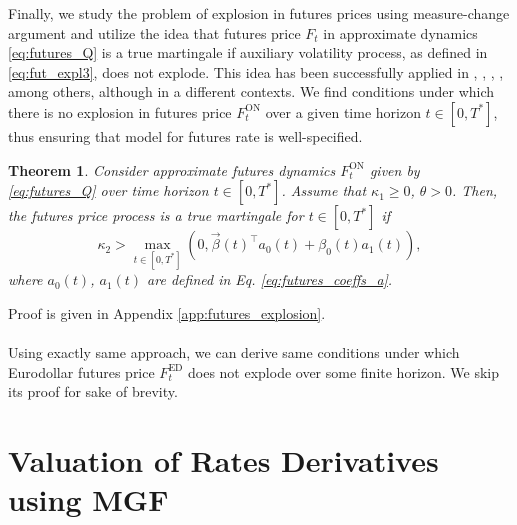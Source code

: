 \documentclass[pdftex,11pt,a4paper] {article}
\newtheorem{theorem}{Theorem}[section]
\begin{document}

 
Finally, we study the problem of explosion in futures prices using measure-change argument and utilize the idea that futures price $ F_t$ in approximate dynamics \eqref{eq:futures_Q} is a true martingale if auxiliary volatility process, as defined in \eqref{eq:fut_expl3}, does not explode. This idea has been successfully applied in \cite{Sin1998}, \cite{Lewis2000}, \cite{Lucic2004}, \cite{Lions2007}, among others, although in a different contexts. We find conditions under which there is no explosion in futures price $F^{\mathrm{ON}}_t$ over a given time horizon $t\in [0,T^*]$, thus ensuring that model for futures rate is well-specified. 

\begin{theorem}\label{thm:futures_explosion}
Consider approximate futures dynamics $ F^{\mathrm{ON}}_t$ given by \eqref{eq:futures_Q} over time horizon $t\in [0,T^*]$. Assume that $\kappa_1\ge 0$, $\theta>0$. Then, the futures price process is a true martingale for $t\in [0,T^*]$ if
\begin{equation}\label{eq:fut_expl0}
\kappa_2>\max_{t\in [0,T^*]}\left(0,\vec{\beta}(t)^\top a_0(t)+\beta_0(t)a_1(t)\right),
\end{equation}
where $a_0(t)$, $a_1(t)$ are defined in Eq. \eqref{eq:futures_coeffs_a}. 
\end{theorem}
Proof is given in Appendix \ref{app:futures_explosion}. \\\\
  Using exactly same approach, we can derive same conditions under which Eurodollar futures price  $ F^{\mathrm{ED}}_t$ does not explode over some finite horizon. We skip its proof for sake of brevity.  


\section{Valuation of Rates Derivatives using MGF}\label{sec::valution_market_instum}
\end{document}
